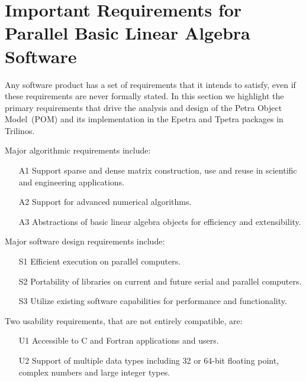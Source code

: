 \documentclass[10pt,relax]{PetraObjectModel}
\newcommand{\pom}{Petra Object Model}
\newcommand{\POM}{POM}
\begin{document}
\section{Important Requirements for Parallel Basic Linear Algebra Software}

Any software product has a set of requirements that it intends to
satisfy, even if these requirements are never formally stated.  In
this section we highlight the primary requirements that drive the
analysis and design of the \pom\ (\POM) and its implementation in
the Epetra and Tpetra packages in Trilinos.

Major algorithmic requirements include:
\begin{itemize}
\item[A1] Support sparse and dense matrix construction, use and reuse in scientific and engineering applications.
\item[A2] Support for advanced numerical algorithms.
\item[A3] Abstractions of basic linear algebra objects for efficiency and
extensibility.
\end{itemize}
Major software design requirements include:
\begin{itemize}
\item[S1] Efficient execution on parallel computers.
\item[S2] Portability of libraries on current and future serial and parallel computers.
\item[S3] Utilize existing software capabilities for performance and
functionality.
\end{itemize}
Two usability requirements, that are not entirely compatible, are:
\begin{itemize}
\item[U1] Accessible to C and Fortran applications and users.
\item[U2] Support of multiple data types including 32 or 64-bit floating
point, complex numbers and large integer types.
\end{itemize}
\end{document}
